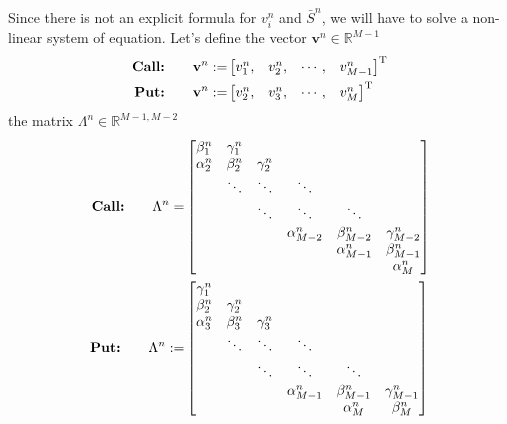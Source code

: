 Since there is not an explicit formula for $v^{n}_{i}$ and $\bar{S}^n$, we will 
have to solve a non-linear system of equation. Let's define the vector $\mathbf{v}^n \in \mathbb{R}^{M-1}$ 
\begin{subequations}
  \begin{align}
    \text{\textbf{Call:}} \qquad \mathbf{v}^{n} :=& \begin{bmatrix}
      v^{n}_{1}, & v^{n}_{2}, & \cdots, & v^{n}_{M-1}
    \end{bmatrix}^{\text{T}}\\
    \text{\textbf{Put:}} \qquad \mathbf{v}^{n} :=& \begin{bmatrix}
      v^{n}_{2}, & v^{n}_{3}, & \cdots, & v^{n}_{M}
    \end{bmatrix}^{\text{T}}
  \end{align}    
\end{subequations}
the matrix $\Lambda^{n} \in \mathbb{R}^{M-1,M-2}$ 
\begin{subequations}
  \begin{align}
    \text{\textbf{Call:}} \qquad \Lambda^{n} =& \begin{bmatrix}
      \beta^{n}_{1} & \gamma^{n}_1 \\
      \alpha^{n}_{2} & \beta^{n}_{2} & \gamma^{n}_{2} \\
      & \ddots & \ddots & \ddots  \\
      & & \ddots & \ddots & \ddots  \\
      & & & \alpha^{n}_{M-2} & \beta^{n}_{M-2} & \gamma^{n}_{M-2} \\
      & & & & \alpha^{n}_{M-1} & \beta^{n}_{M-1} \\
      & & & & & \alpha^{n}_{M} \\
    \end{bmatrix}\\
    \text{\textbf{Put:}} \qquad  \Lambda^{n} :=& \begin{bmatrix}
      \gamma^{n}_1 \\
      \beta^{n}_2 & \gamma^{n}_2 \\
      \alpha^{n}_3 & \beta^{n}_3 & \gamma^{n}_3 \\
      & \ddots & \ddots & \ddots \\
      & & \ddots & \ddots & \ddots \\
      & & & \alpha^{n}_{M-1} & \beta^{n}_{M-1} & \gamma^{n}_{M-1} \\
      & & & & \alpha^{n}_{M} & \beta^{n}_{M} \\
    \end{bmatrix}
  \end{align}
\end{subequations}
